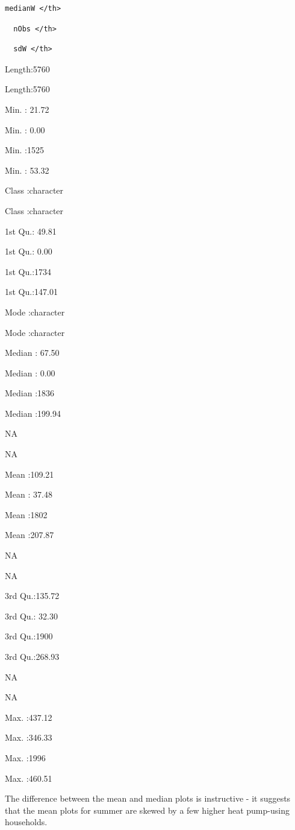 \documentclass[]{article}
\begin{document}
\begin{verbatim}
medianW </th>
\end{verbatim}

\begin{verbatim}
  nObs </th>
\end{verbatim}

\begin{verbatim}
  sdW </th>
\end{verbatim}

Length:5760

Length:5760

Min. : 21.72

Min. : 0.00

Min. :1525

Min. : 53.32

Class :character

Class :character

1st Qu.: 49.81

1st Qu.: 0.00

1st Qu.:1734

1st Qu.:147.01

Mode :character

Mode :character

Median : 67.50

Median : 0.00

Median :1836

Median :199.94

NA

NA

Mean :109.21

Mean : 37.48

Mean :1802

Mean :207.87

NA

NA

3rd Qu.:135.72

3rd Qu.: 32.30

3rd Qu.:1900

3rd Qu.:268.93

NA

NA

Max. :437.12

Max. :346.33

Max. :1996

Max. :460.51

The difference between the mean and median plots is instructive - it
suggests that the mean plots for summer are skewed by a few higher heat
pump-using households.
\end{document}

